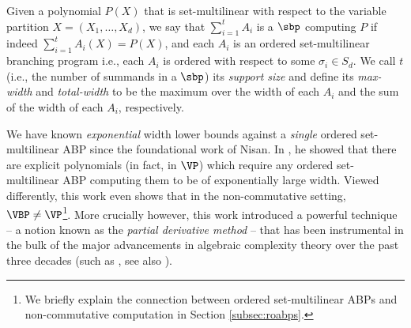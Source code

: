 \documentclass{article}
\begin{document}

\begin{definition}[$\sbp$]\label{def:sum}
Given a polynomial $P(X)$ that is set-multilinear with respect to the variable partition $X = (X_1,\ldots, X_d)$, we say that $\sum_{i=1}^t A_i$ is a $\sbp$ computing $P$ if indeed $\sum_{i=1}^t A_i(X) = P(X)$, and
each $A_i$ is an ordered set-multilinear branching program i.e., each $A_i$ is ordered with respect to some $\sigma_i\in S_d$. We call $t$ (i.e., the number of summands in a $\sbp$) its \emph{support size} and define its \emph{max-width} and \emph{total-width} to be the maximum over the width of each $A_i$ and the sum of the width of each $A_i$, respectively.    
\end{definition}


We have known \emph{exponential} width lower bounds against a \emph{single} ordered set-multilinear ABP since the foundational work of Nisan.
In \cite{Nisan91}, he showed that there are explicit polynomials (in fact, in $\VP$) which require any ordered set-multilinear ABP computing them to be of exponentially large width. 
Viewed differently, this work even shows that in the non-commutative setting, $\VBP \neq \VP$\footnote{We briefly explain the connection between ordered set-multilinear ABPs and non-commutative computation in Section \ref{subsec:roabps}.}. 
More crucially however, this work introduced a powerful technique -- a notion known as the \emph{partial derivative method} -- that has been instrumental in the bulk of the major advancements in algebraic complexity theory over the past three decades (such as \cite{NisanW97,Raz06, RazY09, Kayal12, KayalST16, KayalLSS17, /KumarS17, LST1, LST2}, see also \cite{ShpilkaY10,Saptarishi-survey}). 
\end{document}
